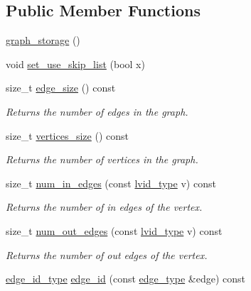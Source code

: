 \subsection*{Public Member Functions}
\begin{DoxyCompactItemize}
\item 
\hyperlink{classsaedb_1_1graph__storage_a8368d23b60661abd80459ea13b943ba9}{graph\-\_\-storage} ()
\item 
void \hyperlink{classsaedb_1_1graph__storage_aa13e8fb232d93bb9034723b1cd7ead9c}{set\-\_\-use\-\_\-skip\-\_\-list} (bool x)
\item 
size\-\_\-t \hyperlink{classsaedb_1_1graph__storage_af54598839feaf684a6e8b0a713f7646e}{edge\-\_\-size} () const 
\begin{DoxyCompactList}\small\item\em Returns the number of edges in the graph. \end{DoxyCompactList}\item 
size\-\_\-t \hyperlink{classsaedb_1_1graph__storage_aef133d33e0d38b5fa913ec8e60889bd2}{vertices\-\_\-size} () const 
\begin{DoxyCompactList}\small\item\em Returns the number of vertices in the graph. \end{DoxyCompactList}\item 
size\-\_\-t \hyperlink{classsaedb_1_1graph__storage_ae697804cb0a6de524e889576135a2081}{num\-\_\-in\-\_\-edges} (const \hyperlink{classsaedb_1_1graph__storage_a147a907accd64bb1f803a423d04dd04b}{lvid\-\_\-type} v) const 
\begin{DoxyCompactList}\small\item\em Returns the number of in edges of the vertex. \end{DoxyCompactList}\item 
size\-\_\-t \hyperlink{classsaedb_1_1graph__storage_a68f4516cc90dc28358e38fb66ee4a073}{num\-\_\-out\-\_\-edges} (const \hyperlink{classsaedb_1_1graph__storage_a147a907accd64bb1f803a423d04dd04b}{lvid\-\_\-type} v) const 
\begin{DoxyCompactList}\small\item\em Returns the number of out edges of the vertex. \end{DoxyCompactList}\item 
\hyperlink{classsaedb_1_1graph__storage_a7861f26a1e724120e58d9feba4da37a1}{edge\-\_\-id\-\_\-type} \hyperlink{classsaedb_1_1graph__storage_ae65b533b705b73767b458fba75a76fe0}{edge\-\_\-id} (const \hyperlink{classsaedb_1_1graph__storage_1_1edge__type}{edge\-\_\-type} \&edge) const 

\end{DoxyCompactItemize}
